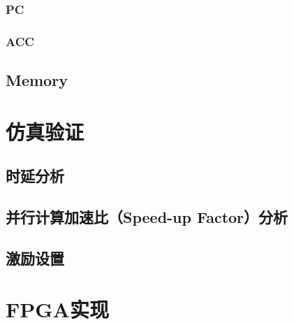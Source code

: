 \documentclass[lang=cn,a4paper,newtx]{elegantpaper}
\begin{document}
\subsubsection{PC}

\subsubsection{ACC}
\subsection{Memory}




\section{仿真验证}
\subsection{时延分析}
\subsection{并行计算加速比（Speed-up Factor）分析}
\subsection{激励设置}

\section{FPGA实现}
\end{document}
